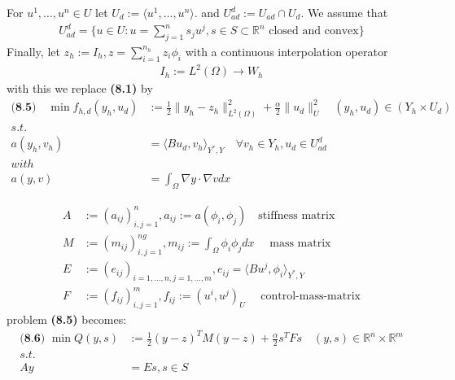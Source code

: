 For $u^1, \dots, u^n \in U$ let $U_d:= \langle u^1, \dots, u^n \rangle$. and $U_{ad}^d := U_{ad} \cap U_d$. We assume that
\begin{align*}
	U_{ad}^d = \{u \in U: u = \sum_{j = 1}^n s_j u^j, s \in S \subset \mathbb{R}^n \text{ closed and convex} \}
\end{align*} 
Finally, let $z_h:= I_h, z = \sum_{i = 1}^{n_h} z_i \phi_i$ with a continuous interpolation operator 
\begin{align*}
	I_h:= L^2(\Omega) \rightarrow W_h
\end{align*}
with this we replace \textbf{(8.1)} by 
\begin{align*}
\textbf{(8.5)} \quad
	\min f_{h,d} (y_h, u_d) &:= \frac{1}{2}\|y_h - z_h\|_{L^2(\Omega)}^2 + \frac{\alpha}{2}\|u_d\|^2_U \quad (y_h, u_d) \in (Y_h \times U_d)\\
	s.t.\\
	a(y_h, v_h) &= \langle Bu_d, v_h \rangle_{Y^*, Y} \quad \forall v_h \in Y_h, u_d \in U_{ad}^d\\
	with\\
	a(y, v) &= \int_\Omega \nabla y \cdot \nabla v dx
\end{align*}

\begin{align*}
	A&:= (a_{ij})_{i, j = 1}^n, a_{ij} := a(\phi_i, \phi_j) \quad \text{stiffness matrix}\\
	M&:= (m_{ij})_{i, j = 1}^{ng}, m_{ij} := \int_\Omega \phi_i \phi_j dx \quad \text{ mass matrix}\\
	E&:= (e_{ij})_{i = 1, \dots, n, j = 1, \dots, m}, e_{ij} = \langle Bu^j, \phi_i \rangle_{Y^*, Y}\\
	F&:= (f_{ij})_{i, j = 1}^m, f_{ij}:= (u^i, u^j)_U \quad \text{ control-mass-matrix}
\end{align*}
problem \textbf{(8.5)} becomes:
\begin{align*}
\textbf{(8.6) }
	\min Q(y, s)&:= \frac{1}{2}(y - z)^T M(y - z) + \frac{\alpha}{2} s^T F s  \quad (y, s) \in \mathbb{R}^n \times \mathbb{R}^m\\
	s.t.\\
	Ay &= Es, s \in S 
\end{align*}

